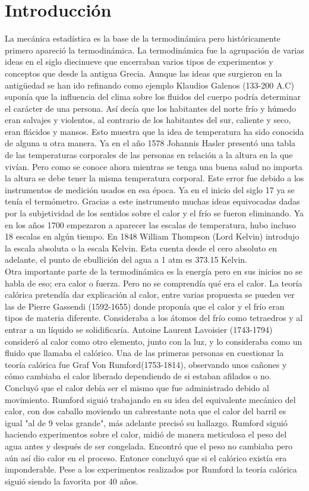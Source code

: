 \chapter{Introducción}

La mecánica estadística es la base de la termodinámica pero históricamente primero apareció la termodinámica. La termodinámica fue la agrupación de varias ideas en el siglo diecinueve que encerraban varios tipos de experimentos  y conceptos que desde la antigua Grecia. Aunque las ideas que surgieron en la antigüedad se han ido refinando como ejemplo Klaudios Galenos (133-200 A.C) suponía que la influencia del clima sobre los fluidos del cuerpo podría determinar el carácter de una persona. Así decía que los habitantes del norte frío y húmedo eran salvajes y violentos, al contrario de los habitantes del sur, caliente y seco, eran flácidos y mansos. Esto muestra que la idea de temperatura ha sido conocida de alguna u otra manera. Ya en el año 1578  Johannis Hasler presentó una tabla de las temperaturas corporales de las personas en relación a la altura en la que vivían. Pero como se conoce ahora mientras se tenga una buena salud no importa la altura se debe tener la misma temperatura corporal. Este error fue debido a los instrumentos de medición usados en esa época. Ya en el inicio del siglo 17 ya se tenía el termómetro. Gracias a este instrumento muchas ideas equivocadas dadas por la subjetividad de los sentidos sobre el calor y el frío se fueron eliminando. Ya en los años 1700 empezaron a aparecer las escalas de temperatura, hubo incluso 18 escalas en algún tiempo. En 1848 William Thompson (Lord Kelvin)  introdujo la escala absoluta o la escala Kelvin. Esta cuenta desde el cero absoluto en adelante, el punto de ebullición del agua a  1 atm es 373.15 Kelvin.
\\
Otra importante parte de la termodinámica es la energía pero en sus inicios no se habla de eso; era calor o fuerza. Pero no se comprendía qué era el calor. La teoría calórica pretendía dar explicación al calor, entre varias propuesta se pueden ver las de Pierre Gassendi (1592-1655) donde proponía que el calor y el frío eran tipos de materia diferente. Consideraba a los átomos del frío como tetraedros y al entrar a un líquido se solidificaría. Antoine Laurent Lavoisier (1743-1794) consideró al calor como otro elemento, junto con la luz, y lo consideraba como un fluido que llamaba el calórico. Una de las primeras personas en cuestionar la teoría calórica fue Graf Von Rumford(1753-1814), observando unos cañones y cómo cambiaba el calor liberado dependiendo de si estaban afilados  o no. Concluyó que el calor debía ser el mismo que fue administrado debido al movimiento. Rumford siguió trabajando en su idea del equivalente mecánico del calor, con dos caballo moviendo un cabrestante nota que el calor del barril es igual "al de 9 velas grande", más adelante precisó su hallazgo. Rumford siguió haciendo experimentos sobre el calor, midió de manera meticulosa el peso del agua antes y después de ser congelada. Encontró que el peso no cambiaba pero aún así dio calor en el proceso. Entonce concluyó que si el calórico existía era imponderable. Pese a los experimentos realizados por Rumford la teoría calórica siguió siendo la favorita por 40 años.	
